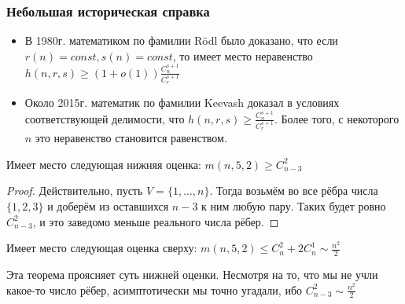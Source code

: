 \subsubsection*{Небольшая историческая справка}

\begin{itemize}
	\item В 1980г. математиком по фамилии Rödl было доказано, что если $r(n) = const, s(n) = const$, то имеет место неравенство \(h(n, r, s) \ge (1 + o(1)) \frac{C_n^{s + 1}}{C_r^{s + 1}}\)
	
	\item Около 2015г. математик по фамилии Keevash доказал в условиях соответствующей делимости, что $h(n, r, s) \ge \frac{C_n^{s + 1}}{C_r^{s + 1}}$. Более того, с некоторого $n$ это неравенство становится равенством.
\end{itemize}

\begin{proposition}
	Имеет место следующая нижняя оценка: \(m(n, 5, 2) \ge C_{n - 3}^2\)
\end{proposition}

\begin{proof}
	Действительно, пусть $V = \{1, \ldots, n\}$. Тогда возьмём во все рёбра числа $\{1, 2, 3\}$ и доберём из оставшихся $n - 3$ к ним любую пару. Таких будет ровно $C_{n - 3}^2$, и это заведомо меньше реального числа рёбер.
\end{proof}

\begin{theorem}
	Имеет место следующая оценка сверху: \(m(n, 5, 2) \le C_n^2 + 2C_n^1 \sim \frac{n^2}{2}\)
\end{theorem}

\begin{note}
	Эта теорема проясняет суть нижней оценки. Несмотря на то, что мы не учли какое-то число рёбер, асимптотически мы точно угадали, ибо $C_{n - 3}^2 \sim \frac{n^2}{2}$
\end{note}

